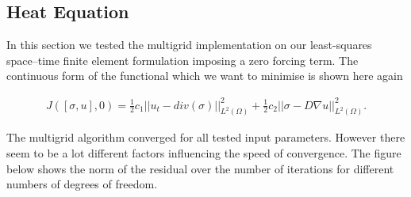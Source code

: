 \documentclass[../draft_1.tex]{subfiles}
\begin{document}
\FloatBarrier
\subsection{Heat Equation}

In this section we tested the multigrid implementation on our least-squares space--time finite element formulation imposing a zero forcing term. The continuous form of the functional which we want to minimise is shown here again

\begin{ceqn}
	\begin{equation}
	\begin{aligned}
	\label{J_heat_equation}
	J([\sigma, u], 0) = \frac{1}{2} c_1 || u_t - div(\sigma) ||_{L^2(\Omega)}^2 + \frac{1}{2} c_2 || \sigma - D \nabla u ||_{L^2(\Omega)}^2.
	\end{aligned}
	\end{equation}
\end{ceqn}

The multigrid algorithm converged for all tested input parameters. However there seem to be a lot different factors influencing the speed of convergence. The figure below shows the norm of the residual over the number of iterations for different numbers of degrees of freedom. 
\end{document}
